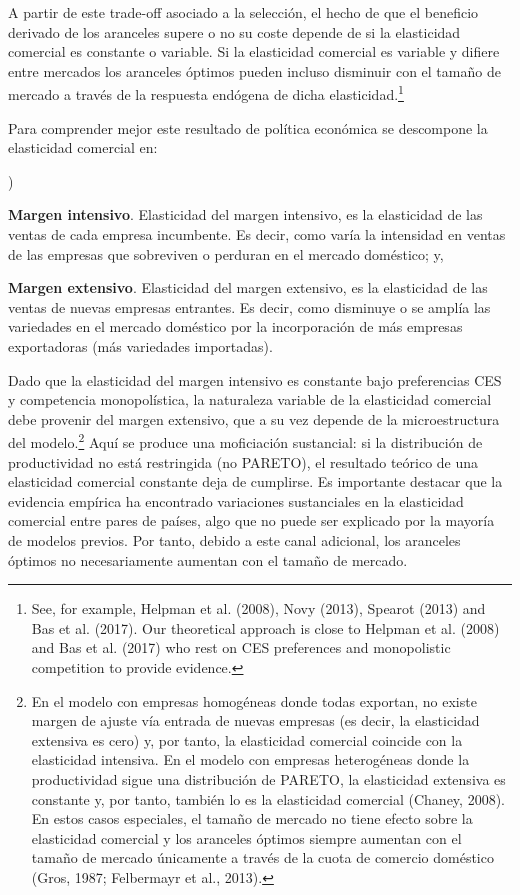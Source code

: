 \documentclass[10pt,a4paper]{article}
\newcounter{alphaitem}
\newenvironment{la}
      {\begin{list}{\alph{alphaitem})}{%
          \usecounter{alphaitem}%
          \setlength{\leftmargin}{1cm}%
          \setlength{\parskip}{3pt}%
          \setlength{\itemsep}{0pt}%
          \setlength{\parsep}{0pt}%
      }}
      {\end{list}}
\begin{document}
A partir de este trade-off asociado a la selección, el hecho de que el beneficio derivado de los aranceles supere o no su coste depende de si la elasticidad comercial es constante o variable. Si la elasticidad comercial es variable y difiere entre mercados los aranceles óptimos pueden incluso disminuir con el tamaño de mercado a través de la respuesta endógena de dicha elasticidad.\footnote{%
    See, for example, Helpman et al. (2008), Novy (2013), Spearot (2013) and Bas et al. (2017). Our theoretical approach is close to Helpman et al. (2008) and Bas et al. (2017) who rest on CES preferences and monopolistic competition to provide evidence.
}

Para comprender mejor este resultado de política económica se descompone la elasticidad comercial en:
\begin{la}
    \item \textbf{Margen intensivo}. Elasticidad del margen intensivo, es la elasticidad de las ventas de cada empresa incumbente. Es decir, como varía la intensidad en ventas de las empresas que sobreviven o perduran en el mercado doméstico; y,
    \item \textbf{Margen extensivo}. Elasticidad del margen extensivo, es la elasticidad de las ventas de nuevas empresas entrantes. Es decir, como disminuye o se amplía las variedades en el mercado doméstico por la incorporación de más empresas exportadoras (más variedades importadas).
\end{la} 

Dado que la elasticidad del margen intensivo es constante bajo preferencias CES y competencia monopolística, la naturaleza variable de la elasticidad comercial debe provenir del margen extensivo, que a su vez depende de la microestructura del modelo.\footnote{%
    En el modelo con empresas homogéneas donde todas exportan, no existe margen de ajuste vía entrada de nuevas empresas (es decir, la elasticidad extensiva es cero) y, por tanto, la elasticidad comercial coincide con la elasticidad intensiva. En el modelo con empresas heterogéneas donde la productividad sigue una distribución de PARETO, la elasticidad extensiva es constante y, por tanto, también lo es la elasticidad comercial (Chaney, 2008). En estos casos especiales, el tamaño de mercado no tiene efecto sobre la elasticidad comercial y los aranceles óptimos siempre aumentan con el tamaño de mercado únicamente a través de la cuota de comercio doméstico (Gros, 1987; Felbermayr et al., 2013).
} Aquí se produce una moficiación sustancial: si la distribución de productividad no está restringida (no PARETO), el resultado teórico de una elasticidad comercial constante deja de cumplirse. Es importante destacar que la evidencia empírica ha encontrado variaciones sustanciales en la elasticidad comercial entre pares de países, algo que no puede ser explicado por la mayoría de modelos previos. Por tanto, debido a este canal adicional, los aranceles óptimos no necesariamente aumentan con el tamaño de mercado.
\end{document}
